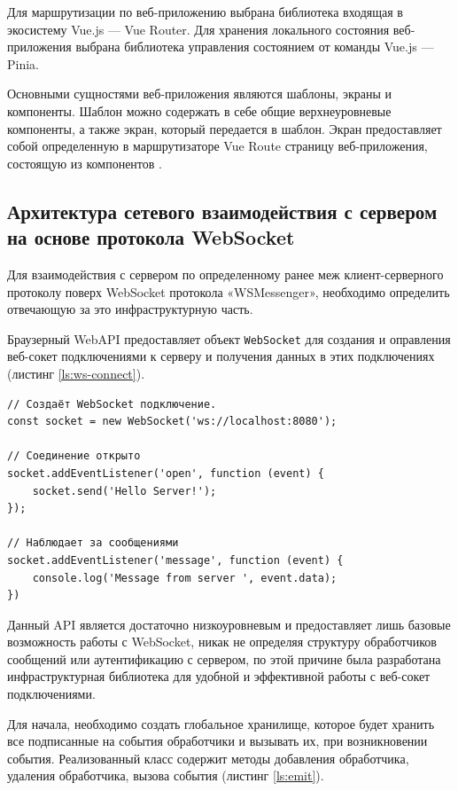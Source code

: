 Для маршрутизации по веб-приложению выбрана библиотека входящая в экосистему Vue.js — Vue Router. Для хранения локального состояния веб-приложения выбрана библиотека управления состоянием от команды Vue.js — Pinia.

Основными сущностями веб-приложения являются шаблоны, экраны и компоненты. Шаблон можно содержать в себе общие верхнеуровневые компоненты, а также экран, который передается в шаблон. Экран предоставляет собой определенную в маршрутизаторе Vue Route страницу веб-приложения, состоящую из компонентов \cite{vuejsrouter}.

\subsection{Архитектура сетевого взаимодействия с сервером на основе протокола WebSocket}

Для взаимодействия с сервером по определенному ранее меж клиент-серверного протоколу поверх WebSocket протокола «WSMessenger», необходимо определить отвечающую за это инфраструктурную часть.

Браузерный WebAPI предоставляет объект \verb|WebSocket| для создания и оправления веб-сокет подключениями к серверу и получения данных в этих подключениях (листинг \ref{ls:ws-connect}).

\begin{lstlisting}[caption={Подключение к WebSocket серверу при помощи WebSockt API}, label={ls:ws-connect}]
// Создаёт WebSocket подключение.
const socket = new WebSocket('ws://localhost:8080');

// Соединение открыто
socket.addEventListener('open', function (event) {
    socket.send('Hello Server!');
});

// Наблюдает за сообщениями
socket.addEventListener('message', function (event) {
    console.log('Message from server ', event.data);
})
\end{lstlisting}

Данный API является достаточно низкоуровневым и предоставляет лишь базовые возможность работы с WebSocket, никак не определяя структуру обработчиков сообщений или аутентификацию с сервером, по этой причине была разработана инфраструктурная библиотека для удобной и эффективной работы с веб-сокет подключениями.

Для начала, необходимо создать глобальное хранилище, которое будет хранить все подписанные на события обработчики и вызывать их, при возникновении события. Реализованный класс содержит методы добавления обработчика, удаления обработчика, вызова события (листинг \ref{ls:emit}).

